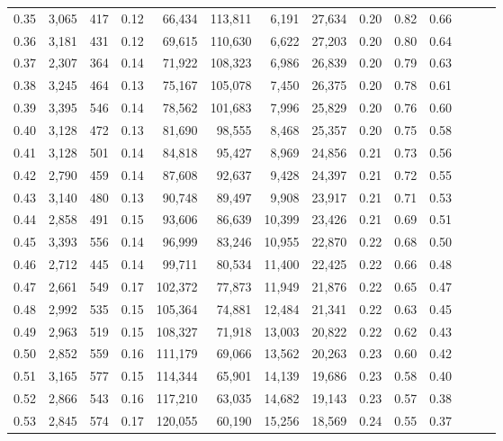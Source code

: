 \begin{tabular}{rrrrrrrrrrrrrr}
0.35 &  3,065 &  417 &  0.12 &   66,434 &  113,811 &   6,191 &  27,634 &  0.20 &  0.82 &      0.66 \\
0.36 &  3,181 &  431 &  0.12 &   69,615 &  110,630 &   6,622 &  27,203 &  0.20 &  0.80 &      0.64 \\
0.37 &  2,307 &  364 &  0.14 &   71,922 &  108,323 &   6,986 &  26,839 &  0.20 &  0.79 &      0.63 \\
0.38 &  3,245 &  464 &  0.13 &   75,167 &  105,078 &   7,450 &  26,375 &  0.20 &  0.78 &      0.61 \\
0.39 &  3,395 &  546 &  0.14 &   78,562 &  101,683 &   7,996 &  25,829 &  0.20 &  0.76 &      0.60 \\
0.40 &  3,128 &  472 &  0.13 &   81,690 &   98,555 &   8,468 &  25,357 &  0.20 &  0.75 &      0.58 \\
0.41 &  3,128 &  501 &  0.14 &   84,818 &   95,427 &   8,969 &  24,856 &  0.21 &  0.73 &      0.56 \\
0.42 &  2,790 &  459 &  0.14 &   87,608 &   92,637 &   9,428 &  24,397 &  0.21 &  0.72 &      0.55 \\
0.43 &  3,140 &  480 &  0.13 &   90,748 &   89,497 &   9,908 &  23,917 &  0.21 &  0.71 &      0.53 \\
0.44 &  2,858 &  491 &  0.15 &   93,606 &   86,639 &  10,399 &  23,426 &  0.21 &  0.69 &      0.51 \\
0.45 &  3,393 &  556 &  0.14 &   96,999 &   83,246 &  10,955 &  22,870 &  0.22 &  0.68 &      0.50 \\
0.46 &  2,712 &  445 &  0.14 &   99,711 &   80,534 &  11,400 &  22,425 &  0.22 &  0.66 &      0.48 \\
0.47 &  2,661 &  549 &  0.17 &  102,372 &   77,873 &  11,949 &  21,876 &  0.22 &  0.65 &      0.47 \\
0.48 &  2,992 &  535 &  0.15 &  105,364 &   74,881 &  12,484 &  21,341 &  0.22 &  0.63 &      0.45 \\
0.49 &  2,963 &  519 &  0.15 &  108,327 &   71,918 &  13,003 &  20,822 &  0.22 &  0.62 &      0.43 \\
0.50 &  2,852 &  559 &  0.16 &  111,179 &   69,066 &  13,562 &  20,263 &  0.23 &  0.60 &      0.42 \\
0.51 &  3,165 &  577 &  0.15 &  114,344 &   65,901 &  14,139 &  19,686 &  0.23 &  0.58 &      0.40 \\
0.52 &  2,866 &  543 &  0.16 &  117,210 &   63,035 &  14,682 &  19,143 &  0.23 &  0.57 &      0.38 \\
0.53 &  2,845 &  574 &  0.17 &  120,055 &   60,190 &  15,256 &  18,569 &  0.24 &  0.55 &      0.37 \\

\end{tabular}
